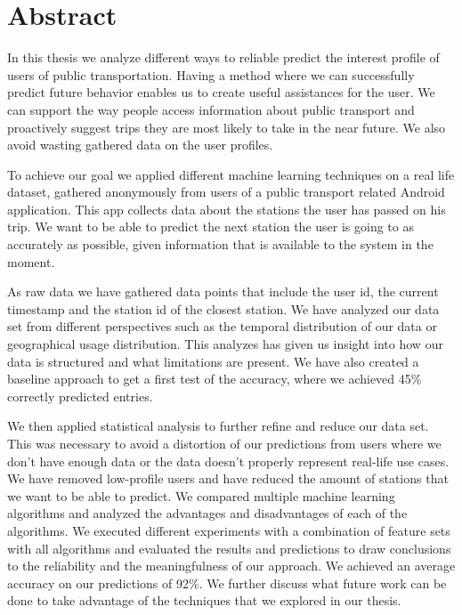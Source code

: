 \newpage
\section{Abstract}

In this thesis we analyze different ways to reliable predict the interest profile of users of public transportation. Having a method where we can successfully predict future behavior enables us to create useful assistances for the user. We can support the way people access information about public transport and proactively suggest trips they are most likely to take in the near future. We also avoid wasting gathered data on the user profiles.

To achieve our goal we applied different machine learning techniques on a real life dataset, gathered anonymously from users of a public transport related Android application. This app collects data about the stations the user has passed on his trip. We want to be able to predict the next station the user is going to as accurately as possible, given information that is available to the system in the moment.

As raw data we have gathered data points that include the user id, the current timestamp and the station id of the closest station. We have analyzed our data set from different perspectives such as the temporal distribution of our data or geographical usage distribution. This analyzes has given us insight into how our data is structured and what limitations are present. We have also created a baseline approach to get a first test of the accuracy, where we achieved 45\% correctly predicted entries.

We then applied statistical analysis to further refine and reduce our data set. This was necessary to avoid a distortion of our predictions from users where we don't have enough data or the data doesn't properly represent real-life use cases. We have removed low-profile users and have reduced the amount of stations that we want to be able to predict. We compared multiple machine learning algorithms and analyzed the advantages and disadvantages of each of the algorithms. We executed different experiments with a combination of feature sets with all algorithms and evaluated the results and predictions to draw conclusions to the reliability and the meaningfulness of our approach. We achieved an average accuracy on our predictions of 92\%. We further discuss what future work can be done to take advantage of the techniques that we explored in our thesis.
